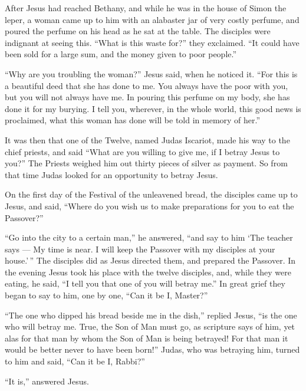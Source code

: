  After Jesus had reached Bethany, and while he was in the
house of Simon the leper,  a woman came up to him with an
alabaster jar of very costly perfume, and poured the perfume on his head
as he sat at the table.  The disciples were indignant at
seeing this. ``What is this waste for?'' they exclaimed. 
``It could have been sold for a large sum, and the money given to poor
people.''

 ``Why are you troubling the woman?'' Jesus said, when he
noticed it. ``For this is a beautiful deed that she has done to me.
 You always have the poor with you, but you will not always
have me.  In pouring this perfume on my body, she has done
it for my burying.  I tell you, wherever, in the whole
world, this good news is proclaimed, what this woman has done will be
told in memory of her.''

 It was then that one of the Twelve, named Judas Iscariot,
made his way to the chief priests,  and said ``What are you
willing to give me, if I betray Jesus to you?'' The Priests weighed him
out thirty pieces of silver as payment.  So from that time
Judas looked for an opportunity to betray Jesus.

 On the first day of the Festival of the unleavened bread,
the disciples came up to Jesus, and said, ``Where do you wish us to make
preparations for you to eat the Passover?''

 ``Go into the city to a certain man,'' he answered, ``and
say to him `The teacher says --- My time is near. I will keep the
Passover with my disciples at your house.'\,''  The
disciples did as Jesus directed them, and prepared the Passover.
 In the evening Jesus took his place with the twelve
disciples,  and, while they were eating, he said, ``I tell
you that one of you will betray me.''  In great grief they
began to say to him, one by one, ``Can it be I, Master?''

 ``The one who dipped his bread beside me in the dish,''
replied Jesus, ``is the one who will betray me.  True, the
Son of Man must go, as scripture says of him, yet alas for that man by
whom the Son of Man is being betrayed! For that man it would be better
never to have been born!''  Judas, who was betraying him,
turned to him and said, ``Can it be I, Rabbi?''

``It is,'' answered Jesus.


